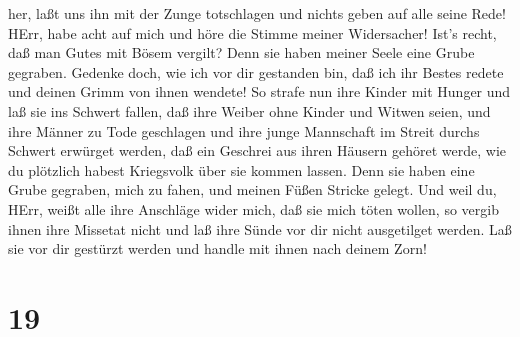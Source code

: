 her, laßt uns ihn mit der Zunge totschlagen und nichts geben auf alle
seine Rede!  HErr, habe acht auf mich und höre die Stimme
meiner Widersacher!  Ist's recht, daß man Gutes mit Bösem
vergilt? Denn sie haben meiner Seele eine Grube gegraben. Gedenke doch,
wie ich vor dir gestanden bin, daß ich ihr Bestes redete und deinen
Grimm von ihnen wendete!  So strafe nun ihre Kinder mit
Hunger und laß sie ins Schwert fallen, daß ihre Weiber ohne Kinder und
Witwen seien, und ihre Männer zu Tode geschlagen und ihre junge
Mannschaft im Streit durchs Schwert erwürget werden,  daß
ein Geschrei aus ihren Häusern gehöret werde, wie du plötzlich habest
Kriegsvolk über sie kommen lassen. Denn sie haben eine Grube gegraben,
mich zu fahen, und meinen Füßen Stricke gelegt.  Und weil
du, HErr, weißt alle ihre Anschläge wider mich, daß sie mich töten
wollen, so vergib ihnen ihre Missetat nicht und laß ihre Sünde vor dir
nicht ausgetilget werden. Laß sie vor dir gestürzt werden und handle mit
ihnen nach deinem Zorn!

\hypertarget{section-18}{%
\section{19}\label{section-18}}


